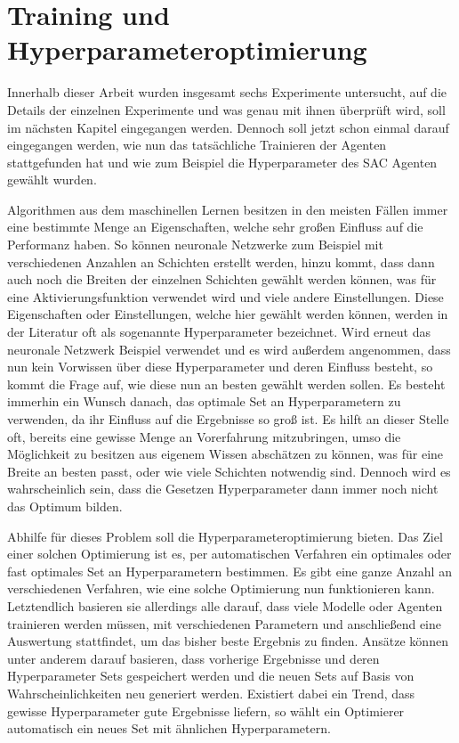 \documentclass[]{iat}
\begin{document}
\section{Training und Hyperparameteroptimierung}
Innerhalb dieser Arbeit wurden insgesamt sechs Experimente untersucht, auf die Details der einzelnen Experimente und was genau mit ihnen überprüft wird, soll im nächsten Kapitel eingegangen werden. Dennoch soll jetzt schon einmal darauf eingegangen werden, wie nun das tatsächliche Trainieren der Agenten stattgefunden hat und wie zum Beispiel die Hyperparameter des SAC Agenten gewählt wurden.

Algorithmen aus dem maschinellen Lernen besitzen in den meisten Fällen immer eine bestimmte Menge an Eigenschaften, welche sehr großen Einfluss auf die Performanz haben. So können neuronale Netzwerke zum Beispiel mit verschiedenen Anzahlen an Schichten erstellt werden, hinzu kommt, dass dann auch noch die Breiten der einzelnen Schichten gewählt werden können, was für eine Aktivierungsfunktion verwendet wird und viele andere Einstellungen. Diese Eigenschaften oder Einstellungen, welche hier gewählt werden können, werden in der Literatur oft als sogenannte Hyperparameter bezeichnet. Wird erneut das neuronale Netzwerk Beispiel verwendet und es wird außerdem angenommen, dass nun kein Vorwissen über diese Hyperparameter und deren Einfluss besteht, so kommt die Frage auf, wie diese nun an besten gewählt werden sollen. Es besteht immerhin ein Wunsch danach, das optimale Set an Hyperparametern zu verwenden, da ihr Einfluss auf die Ergebnisse so groß ist. Es hilft an dieser Stelle oft, bereits eine gewisse Menge an Vorerfahrung mitzubringen, umso die Möglichkeit zu besitzen aus eigenem Wissen abschätzen zu können, was für eine Breite an besten passt, oder wie viele Schichten notwendig sind. Dennoch wird es wahrscheinlich sein, dass die Gesetzen Hyperparameter dann immer noch nicht das Optimum bilden.

Abhilfe für dieses Problem soll die Hyperparameteroptimierung bieten. Das Ziel einer solchen Optimierung ist es, per automatischen Verfahren ein optimales oder fast optimales Set an Hyperparametern bestimmen. Es gibt eine ganze Anzahl an verschiedenen Verfahren, wie eine solche Optimierung nun funktionieren kann. Letztendlich basieren sie allerdings alle darauf, dass viele Modelle oder Agenten trainieren werden müssen, mit verschiedenen Parametern und anschließend eine Auswertung stattfindet, um das bisher beste Ergebnis zu finden. Ansätze können unter anderem darauf basieren, dass vorherige Ergebnisse und deren Hyperparameter Sets gespeichert werden und die neuen Sets auf Basis von Wahrscheinlichkeiten neu generiert werden. Existiert dabei ein Trend, dass gewisse Hyperparameter gute Ergebnisse liefern, so wählt ein Optimierer automatisch ein neues Set mit ähnlichen Hyperparametern.
\end{document}
